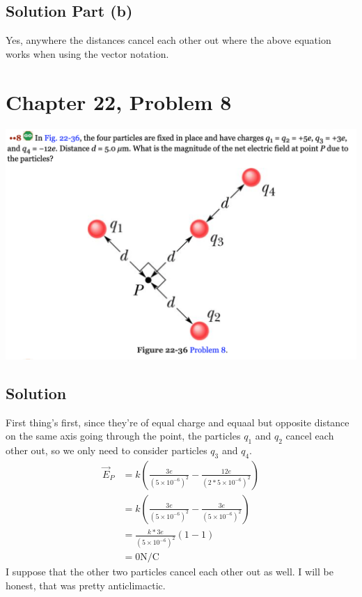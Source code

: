 \documentclass[12pt]{article}
\begin{document}
\subsection*{Solution Part (b)}
Yes, anywhere the distances cancel each other out where the above equation works when using the vector notation.

\pagebreak
\section*{Chapter 22, Problem 8}
\includegraphics[width=\textwidth]{picture_5.png}

\subsection*{Solution}
First thing's first, since they're of equal charge and equaal but opposite distance on the same axis going through the point, the particles $q_1$ and $q_2$ cancel each other out, so we only need to consider particles $q_3$ and $q_4$.
\begin{align*}
    \vec{E}_P   &=  k\left(\frac{3e}{(5\times 10^{-6})^2} - \frac{12e}{(2*5\times 10^{-6})^2}\right)\\
        &=  k\left(\frac{3e}{(5\times 10^{-6})^2} - \frac{3e}{(5\times 10^{-6})^2}\right)\\
        &=  \frac{k*3e}{(5\times 10^{-6})^2}\left(1 - 1\right)\\
        &=  \boxed{0\unit{\newton/\coulomb}}
\end{align*}
I suppose that the other two particles cancel each other out as well. I will be honest, that was pretty anticlimactic. 

\pagebreak
\end{document}
